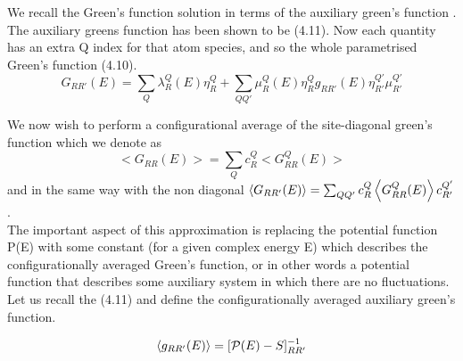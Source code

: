 \documentclass[12pt]{article}
\begin{document}
We recall the Green's function solution in terms of the auxiliary green's function \cite{andersen}.
The auxiliary greens function has been shown to be (4.11).
Now each quantity has an extra Q index for that atom species, and so the whole parametrised Green's function (4.10).
\begin{equation} \label{4.1} \tag{5.1}
G_{RR'}(E)= \sum_Q \lambda_R^Q(E)\eta_R^Q +\sum_{QQ'} \mu_R^Q(E) \eta_R^Q g_{RR'}(E) \eta_{R'}^{Q'} \mu_{R'}^{Q'}
\end{equation}

We now wish to perform a configurational average of the site-diagonal green's function which we denote as $$<G_{RR}(E)>= \sum_Q c_R^Q <G_{RR}^Q(E)>$$ and in the same way with the non diagonal $\expval{G_{RR'}(E)}= \sum_{QQ'} c_R^Q \expval{G_{RR}^Q(E)} c_{R'}^{Q'}$.
\\ 
The important aspect of this approximation is replacing the potential function P(E) with some constant (for a given complex energy E) which describes the configurationally averaged Green's function, or in other words a potential function that describes some auxiliary system in which there are no fluctuations. Let us recall the (4.11) and define the configurationally averaged auxiliary green's function.

$$\expval{g_{RR'}(E)}=[\mathcal{P}(E)-S]^{-1}_{RR'}$$
\end{document}
